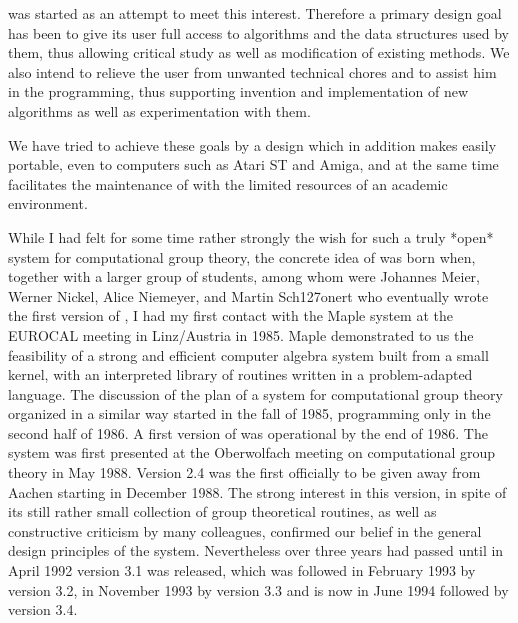 {\GAP} was  started as  an attempt to meet  this  interest.   Therefore a
primary design goal has  been to give its user full access  to algorithms
and the data  structures used  by them, thus  allowing  critical study as
well as  modification of existing methods.  We also intend to relieve the
user from unwanted technical chores and to assist him in the programming,
thus supporting invention and implementation of new algorithms as well as
experimentation with them.

We have tried  to achieve these goals by a design which in addition makes
{\GAP} easily portable, even to computers such as Atari ST and Amiga, and
at the same  time facilitates the maintenance of {\GAP} with  the limited
resources of an academic environment.

While I had felt for some time rather strongly  the wish for such a truly
*open* system for computational group theory, the concrete idea of {\GAP}
was born when, together with a larger group of  students, among whom were
Johannes   Meier,    Werner   Nickel,   Alice     Niemeyer,   and  Martin
Sch{\accent127o}nert who eventually wrote the first  version of {\GAP}, I
had my first contact   with the Maple system   at the EUROCAL  meeting in
Linz/Austria  in  1985.  Maple demonstrated   to us the feasibility  of a
strong  and efficient computer algebra system  built from a small kernel,
with an  interpreted library of   routines written in  a  problem-adapted
language.  The discussion of the plan of a system for computational group
theory organized  in    a similar  way  started  in  the  fall  of  1985,
programming only in the second half  of 1986.  A  first version of {\GAP}
was operational by  the end of 1986.  The  system was first  presented at
the Oberwolfach meeting    on computational group   theory  in May  1988.
Version  2.4  was  the first  officially  to  be  given  away from Aachen
starting in December 1988.  The strong interest in this version, in spite
of its  still rather small  collection of group theoretical  routines, as
well  as constructive criticism  by many colleagues, confirmed our belief
in the general design principles of the  system.  Nevertheless over three
years had passed until in April 1992  version 3.1 was released, which was
followed in February 1993 by version 3.2, in November 1993 by version 3.3
and is now in June 1994 followed by version 3.4.

